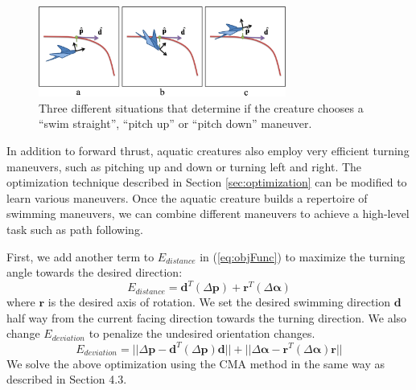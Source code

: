 \begin{figure}[!b]
\centering
\includegraphics[width=3.2in]{figures/pathCase.eps}
\caption{Three different situations that determine if the creature chooses a ``swim straight'', ``pitch up'' or ``pitch down'' maneuver.}
\label{fig:pathCases}
\end{figure}

In addition to forward thrust, aquatic creatures also employ very
efficient turning maneuvers, such as pitching up and down or turning left
and right. The optimization technique described in Section
\ref{sec:optimization} can be modified to learn various
maneuvers. Once the aquatic creature builds a repertoire of swimming
maneuvers, we can combine different maneuvers to achieve a high-level
task such as path following.

First, we add another term to $E_{distance}$ in (\ref{eq:objFunc}) to maximize the turning angle towards the desired direction:
\begin{displaymath}
E_{distance}=\mathbf{d}^T(\Delta \mathbf{p})+\mathbf{r}^T(\Delta\mathbf{\alpha})
\end{displaymath}
where $\mathbf{r}$ is the desired axis of rotation. We set the desired swimming direction $\mathbf{d}$ half way from the current facing direction towards the turning direction. We also change $E_{deviation}$ to penalize the undesired orientation changes.
\begin{displaymath}
E_{deviation} = ||\Delta\mathbf{p}-\mathbf{d}^T(\Delta\mathbf{p})\mathbf{d}|| + ||\Delta\mathbf{\alpha}-\mathbf{r}^T(\Delta\mathbf{\alpha})\mathbf{r}||
\end{displaymath}
We solve the above optimization using the CMA method in the same way as described in Section 4.3.

